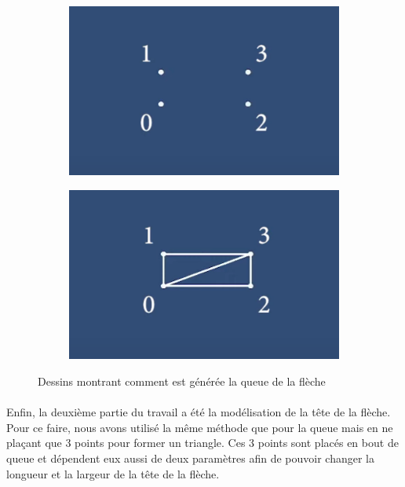 \begin{figure}[H]

\centering

\begin{subfigure}{0.49\textwidth}
\includegraphics[width=1\linewidth]{assets/unity/screen_point1.png} 
\label{fig:unityPoint1}
\end{subfigure}
\begin{subfigure}{0.49\textwidth}
\includegraphics[width=1\linewidth]{assets/unity/screen_point3.png}
\label{fig:unityPoint3}
\end{subfigure}

\caption{Dessins montrant comment est générée la queue de la flèche}
\label{fig:unityPoint1&3}
\end{figure}

\paragraph{} \hspace{10mm}
Enfin, la deuxième partie du travail a été la modélisation de la tête de la flèche. Pour ce faire, nous avons utilisé la même méthode que pour la queue mais en ne plaçant que 3 points pour former un triangle. Ces 3 points sont placés en bout de queue et dépendent eux aussi de deux paramètres afin de pouvoir changer la longueur et la largeur de la tête de la flèche.

